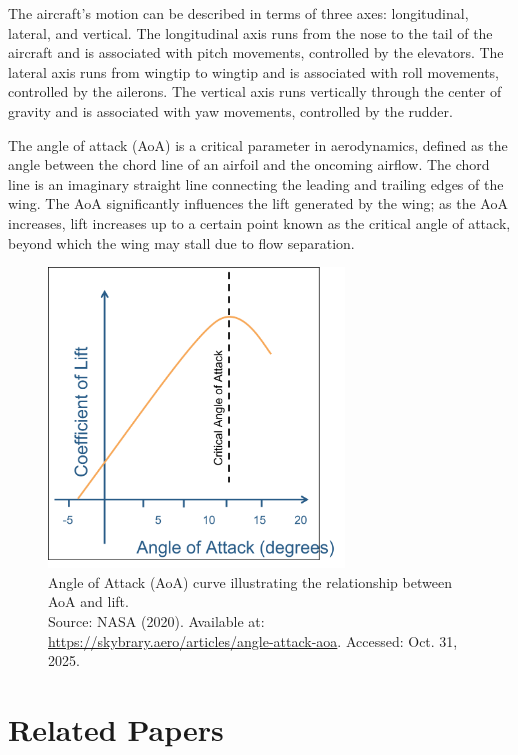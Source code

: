 The aircraft's motion can be described in terms of three axes: longitudinal, lateral, and vertical. The longitudinal axis runs from the nose to the tail of the aircraft and is associated with pitch movements, controlled by the elevators. The lateral axis runs from wingtip to wingtip and is associated with roll movements, controlled by the ailerons. The vertical axis runs vertically through the center of gravity and is associated with yaw movements, controlled by the rudder.

The angle of attack (AoA) is a critical parameter in aerodynamics, defined as the angle between the chord line of an airfoil and the oncoming airflow. The chord line is an imaginary straight line connecting the leading and trailing edges of the wing. The AoA significantly influences the lift generated by the wing; as the AoA increases, lift increases up to a certain point known as the critical angle of attack, beyond which the wing may stall due to flow separation.

\begin{figure}[H]
    \centering
    \includegraphics[width=0.7\textwidth]{figures/angle_of_attack_curve.png}
    \caption{Angle of Attack (AoA) curve illustrating the relationship between AoA and lift. \\ Source: NASA (2020). Available at: \url{https://skybrary.aero/articles/angle-attack-aoa}. Accessed: Oct. 31, 2025.}
    \label{fig:angle_of_attack_curve}
\end{figure}








\section{Related Papers}